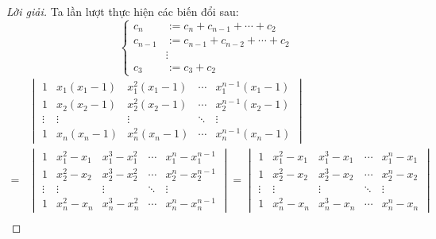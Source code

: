 \documentclass[class=linear-algebra,crop=false]{standalone}
\begin{document}
\begin{proof}[Lời giải]
	\par Ta lần lượt thực hiện các biến đổi sau:
	\[
		\begin{cases}
			c_{n}   & := c_{n} + c_{n-1} + \cdots + c_{2}   \\
			c_{n-1} & := c_{n-1} + c_{n-2} + \cdots + c_{2} \\
			        & \vdots                                \\
			c_{3}   & := c_{3} + c_{2}
		\end{cases}
	\]
	\begingroup{}
	\allowdisplaybreaks{}
	\begin{align*}
		  & \begin{vmatrix}
			    1      & x_{1}(x_{1} - 1) & x_{1}^{2}(x_{1} - 1) & \cdots & x_{1}^{n-1}(x_{1} - 1) \\
			    1      & x_{2}(x_{2} - 1) & x_{2}^{2}(x_{2} - 1) & \cdots & x_{2}^{n-1}(x_{2} - 1) \\
			    \vdots & \vdots           & \vdots               & \ddots & \vdots                 \\
			    1      & x_{n}(x_{n} - 1) & x_{n}^{2}(x_{n} - 1) & \cdots & x_{n}^{n-1}(x_{n} - 1)
		    \end{vmatrix}                                                                                                                                               \\
		= &
		\begin{vmatrix}
			1      & x_{1}^{2} - x_{1} & x_{1}^{3} - x_{1}^{2} & \cdots & x_{1}^{n} - x_{1}^{n-1} \\
			1      & x_{2}^{2} - x_{2} & x_{2}^{3} - x_{2}^{2} & \cdots & x_{2}^{n} - x_{2}^{n-1} \\
			\vdots & \vdots            & \vdots                & \ddots & \vdots                  \\
			1      & x_{n}^{2} - x_{n} & x_{n}^{3} - x_{n}^{2} & \cdots & x_{n}^{n} - x_{n}^{n-1}
		\end{vmatrix}
		=
		\begin{vmatrix}
			1      & x_{1}^{2} - x_{1} & x_{1}^{3} - x_{1} & \cdots & x_{1}^{n} - x_{1} \\
			1      & x_{2}^{2} - x_{2} & x_{2}^{3} - x_{2} & \cdots & x_{2}^{n} - x_{2} \\
			\vdots & \vdots            & \vdots            & \ddots & \vdots            \\
			1      & x_{n}^{2} - x_{n} & x_{n}^{3} - x_{n} & \cdots & x_{n}^{n} - x_{n}
		\end{vmatrix}                                                                                                                                                          \\

\end{align*}
\end{proof}
\end{document}
